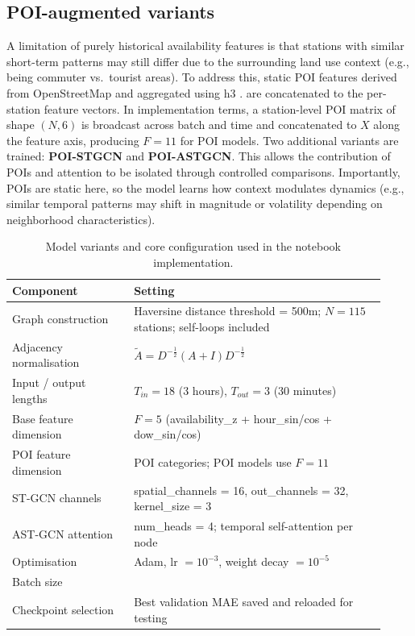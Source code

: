 \documentclass[11pt]{report}
\begin{document}
\subsection{POI-augmented variants}
A limitation of purely historical availability features is that stations with similar short-term patterns may still differ due to the surrounding land use context (e.g., being commuter vs.\ tourist areas). To address this, static POI features derived from OpenStreetMap and aggregated using h3 \cite{osm_copyright,geofabrik_ireland,h3_docs}.
 are concatenated to the per-station feature vectors. In implementation terms, a station-level POI matrix of shape $(N,6)$ is broadcast across batch and time and concatenated to $X$ along the feature axis, producing $F=11$ for POI models. Two additional variants are trained:
\textbf{POI-STGCN} and \textbf{POI-ASTGCN}. This allows the contribution of POIs and attention to be isolated through controlled comparisons. Importantly, POIs are static here, so the model learns how context modulates dynamics (e.g., similar temporal patterns may shift in magnitude or volatility depending on neighborhood characteristics).

\begin{table}[H]
\centering
\small
\caption{Model variants and core configuration used in the notebook implementation.}
\label{tab:model_configs}
\renewcommand{\arraystretch}{1.15}
\begin{tabular}{>{\raggedright\arraybackslash}p{0.30\linewidth} >{\raggedright\arraybackslash}p{0.62\linewidth}}
\hline
\textbf{Component} & \textbf{Setting} \\
\hline
Graph construction & Haversine distance threshold = 500m; $N=115$ stations; self-loops included \\
Adjacency normalisation & $\tilde{A} = D^{-\frac12}(A+I)D^{-\frac12}$ \cite{kipf2017gcn} \\
Input / output lengths & $T_{in}=18$ (3 hours), $T_{out}=3$ (30 minutes) \\
Base feature dimension & $F=5$ (availability\_z + hour\_sin/cos + dow\_sin/cos) \\
POI feature dimension & 6 POI categories; POI models use $F=11$ \\
ST-GCN channels & spatial\_channels = 16, out\_channels = 32, kernel\_size = 3 \\
AST-GCN attention & num\_heads = 4; temporal self-attention per node \cite{vaswani2017attention,pytorch_mha} \\
Optimisation & Adam, lr $=10^{-3}$, weight decay $=10^{-5}$ \cite{kingma2015adam} \\
Batch size & 64 \\
Checkpoint selection & Best validation MAE saved and reloaded for testing \\
\hline
\end{tabular}
\end{table}
\end{document}

